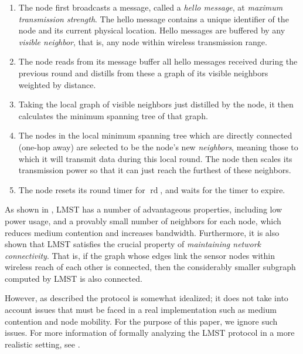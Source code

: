 \documentclass[copyright,creativecommons]{eptcs}
\DeclareMathOperator{\rd}{rd}
\begin{document}
\begin{boxedminipage}{0.90\textwidth}
\begin{center}
\begin{minipage}{0.80\textwidth}
\begin{enumerate}
   \item
\label{step:1}
The node first broadcasts a message, called a \emph{hello message}, at
\emph{maximum transmission strength}. The hello message contains a unique
identifier of the node and its current physical location.  Hello messages are
buffered by any \emph{visible neighbor}, that is, any node within
wireless transmission range.

   \item
\label{step:2}
The node reads from its message buffer all hello messages received during the
previous round and distills from these a graph of its visible neighbors
weighted by distance.  

   \item
\label{step:3}
Taking the local graph of visible neighbors just distilled by the node, it then
calculates the minimum spanning tree of that graph.

   \item
\label{step:4}
The nodes in the local minimum spanning tree which are directly connected
(one-hop away) are selected to be the node's new \emph{neighbors}, meaning
those to which it will transmit data during this local round. The node then
scales its transmission power so that it can just reach the furthest of these
neighbors.

   \item
\label{step:5}
The node resets its round timer for $\rd$, and waits for the timer to expire.
\end{enumerate}
\end{minipage}
\end{center}
\end{boxedminipage}

As shown in \cite{li_2003_01}, LMST has a number of advantageous properties,
including low power usage, and a provably small number of neighbors for each
node, which reduces medium contention and increases bandwidth.  Furthermore, it
is also shown that LMST satisfies the crucial property of \emph{maintaining
network connectivity}.  That is, if the graph whose edges link the sensor nodes
within wireless reach of each other is connected, then the considerably smaller
subgraph computed by LMST is also connected.  

However, as described the protocol is somewhat idealized; it does not take into
account issues that must be faced in a real implementation such as medium
contention and node mobility. For the purpose of this paper, we ignore such
issues. For more information of formally analyzing the LMST protocol in a more
realistic setting, see \cite{katelman_2008_01}.
\end{document}
